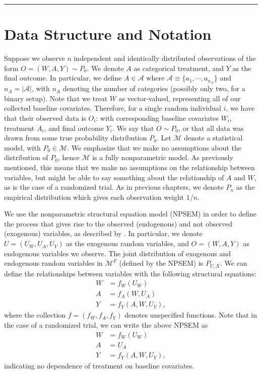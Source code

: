 \documentclass[12pt, krantz2,]{krantz}
\theoremstyle{definition}
\theoremstyle{definition}
\theoremstyle{definition}
\newcommand{\1}{\mathbbm{1}}
\begin{document}
\begin{center}\rule{0.5\linewidth}{0.5pt}\end{center}

\hypertarget{data-structure-and-notation}{%
\section{Data Structure and Notation}\label{data-structure-and-notation}}

Suppose we observe \(n\) independent and identically distributed observations of
the form \(O=(W,A,Y) \sim P_0\). We denote \(A\) as categorical treatment, and \(Y\)
as the final outcome. In particular, we define \(A \in \mathcal{A}\) where
\(\mathcal{A} \equiv \{a_1, \cdots, a_{n_A} \}\) and \(n_A = |\mathcal{A}|\), with
\(n_A\) denoting the number of categories (possibly only two, for a binary setup).
Note that we treat \(W\) as vector-valued, representing all of our collected
baseline covariates. Therefore, for a single random individual \(i\), we have that
their observed data is \(O_i\): with corresponding baseline covariates \(W_i\),
treatment \(A_i\), and final outcome \(Y_i\). We say that \(O \sim P_0\), or that all
data was drawn from some true probability distribution \(P_0\). Let \(\mathcal{M}\)
denote a statistical model, with \(P_0 \in \mathcal{M}\). We emphasize that we
make no assumptions about the distribution of \(P_0\), hence \(\mathcal{M}\) is a
fully nonparametric model. As previously mentioned, this means that we make no
assumptions on the relationship between variables, but might be able to say
something about the relationship of \(A\) and \(W\), as is the case of a randomized
trial. As in previous chapters, we denote \(P_n\) as the empirical distribution
which gives each observation weight \(1/n\).

We use the nonparametric structural equation model (NPSEM) in order to define
the process that gives rise to the observed (endogenous) and not observed
(exogenous) variables, as described by \citet{pearl2009causality}. In particular, we
denote \(U=(U_W,U_A,U_Y)\) as the exogenous random variables, and \(O=(W,A,Y)\) as
endogenous variables we observe. The joint distribution of exogenous and
endogenous random variables in \(\mathcal{M}^F\) (defined by the NPSEM) is
\(P_{U,X}\). We can define the relationships between variables with the following
structural equations:
\begin{align}
  W &= f_W(U_W) \\ A &= f_A(W, U_A) \\ Y &= f_Y(A, W, U_Y),
  \label{eq:npsem-mopttx}
\end{align}
where the collection \(f=(f_W,f_A,f_Y)\) denotes unspecified functions. Note that
in the case of a randomized trial, we can write the above NPSEM as
\begin{align}
  W &= f_W(U_W) \\ A &= U_A \\ Y &= f_Y(A, W, U_Y),
  \label{eq:npsem-rt-mopttx}
\end{align}
indicating no dependence of treatment on baseline covariates.
\end{document}
